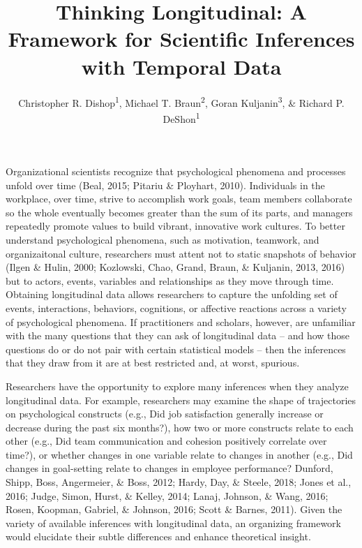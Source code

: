 \documentclass[english,,man]{apa6}
\title{Thinking Longitudinal: A Framework for Scientific Inferences with Temporal Data}
\author{Christopher R. Dishop\textsuperscript{1}, Michael T. Braun\textsuperscript{2}, Goran Kuljanin\textsuperscript{3}, \& Richard P. DeShon\textsuperscript{1}}
\date{}
\affiliation{
\vspace{0.5cm}
\textsuperscript{1} Michigan State University\\\textsuperscript{2} University of South Florida\\\textsuperscript{3} DePaul University}
\begin{document}
\maketitle

Organizational scientists recognize that psychological phenomena and processes unfold over time (Beal, 2015; Pitariu \& Ployhart, 2010). Individuals in the workplace, over time, strive to accomplish work goals, team members collaborate so the whole eventually becomes greater than the sum of its parts, and managers repeatedly promote values to build vibrant, innovative work cultures. To better understand psychological phenomena, such as motivation, teamwork, and organizaitonal culture, researchers must attent not to static snapshots of behavior (Ilgen \& Hulin, 2000; Kozlowski, Chao, Grand, Braun, \& Kuljanin, 2013, 2016) but to actors, events, variables and relationships as they move through time. Obtaining longitudinal data allows researchers to capture the unfolding set of events, interactions, behaviors, cognitions, or affective reactions across a variety of psychological phenomena. If practitioners and scholars, however, are unfamiliar with the many questions that they can ask of longitudinal data -- and how those questions do or do not pair with certain statistical models -- then the inferences that they draw from it are at best restricted and, at worst, spurious.

Researchers have the opportunity to explore many inferences when they analyze longitudinal data. For example, researchers may examine the shape of trajectories on psychological constructs (e.g., Did job satisfaction generally increase or decrease during the past six months?), how two or more constructs relate to each other (e.g., Did team communication and cohesion positively correlate over time?), or whether changes in one variable relate to changes in another (e.g., Did changes in goal-setting relate to changes in employee performance? Dunford, Shipp, Boss, Angermeier, \& Boss, 2012; Hardy, Day, \& Steele, 2018; Jones et al., 2016; Judge, Simon, Hurst, \& Kelley, 2014; Lanaj, Johnson, \& Wang, 2016; Rosen, Koopman, Gabriel, \& Johnson, 2016; Scott \& Barnes, 2011). Given the variety of available inferences with longitudinal data, an organizing framework would elucidate their subtle differences and enhance theoretical insight.
\end{document}
